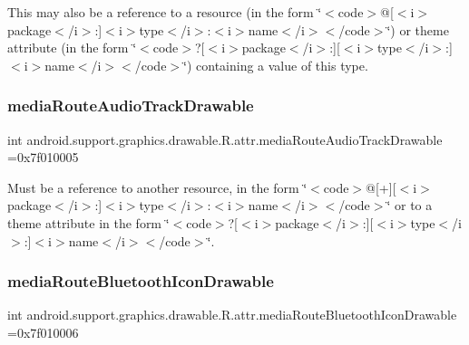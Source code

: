 This may also be a reference to a resource (in the form \char`\"{}$<$code$>$@\mbox{[}$<$i$>$package$<$/i$>$\+:\mbox{]}$<$i$>$type$<$/i$>$\+:$<$i$>$name$<$/i$>$$<$/code$>$\char`\"{}) or theme attribute (in the form \char`\"{}$<$code$>$?\mbox{[}$<$i$>$package$<$/i$>$\+:\mbox{]}\mbox{[}$<$i$>$type$<$/i$>$\+:\mbox{]}$<$i$>$name$<$/i$>$$<$/code$>$\char`\"{}) containing a value of this type. \mbox{\label{classandroid_1_1support_1_1graphics_1_1drawable_1_1R_1_1attr_a727ac607416850be2e83f53eddf77397}} 
\subsubsection{\texorpdfstring{media\+Route\+Audio\+Track\+Drawable}{mediaRouteAudioTrackDrawable}}
{\footnotesize\ttfamily int android.\+support.\+graphics.\+drawable.\+R.\+attr.\+media\+Route\+Audio\+Track\+Drawable =0x7f010005\hspace{0.3cm}{\ttfamily [static]}}

Must be a reference to another resource, in the form \char`\"{}$<$code$>$@\mbox{[}+\mbox{]}\mbox{[}$<$i$>$package$<$/i$>$\+:\mbox{]}$<$i$>$type$<$/i$>$\+:$<$i$>$name$<$/i$>$$<$/code$>$\char`\"{} or to a theme attribute in the form \char`\"{}$<$code$>$?\mbox{[}$<$i$>$package$<$/i$>$\+:\mbox{]}\mbox{[}$<$i$>$type$<$/i$>$\+:\mbox{]}$<$i$>$name$<$/i$>$$<$/code$>$\char`\"{}. \mbox{\label{classandroid_1_1support_1_1graphics_1_1drawable_1_1R_1_1attr_a9f026140d863f9a0450db4c2b23d5b72}} 
\subsubsection{\texorpdfstring{media\+Route\+Bluetooth\+Icon\+Drawable}{mediaRouteBluetoothIconDrawable}}
{\footnotesize\ttfamily int android.\+support.\+graphics.\+drawable.\+R.\+attr.\+media\+Route\+Bluetooth\+Icon\+Drawable =0x7f010006\hspace{0.3cm}{\ttfamily [static]}}

